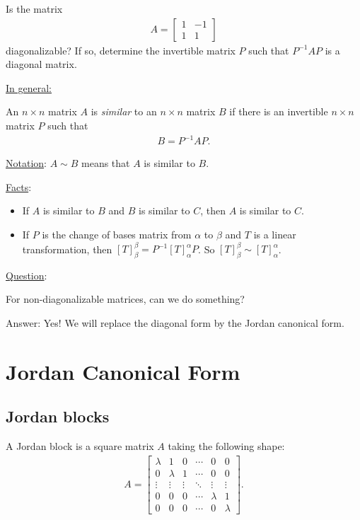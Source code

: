 \documentclass[12pt,a4paper]{article}
\newcounter{example}[section]
\begin{document}
	\newpage
	
	\phantom{2}
	
	\newpage
	
	\begin{example}
	Is the matrix
		\begin{align*}
		A = \begin{bmatrix}
		1 & -1 \\ 1 & 1
		\end{bmatrix}
		\end{align*}
	diagonalizable? If so, determine the invertible matrix $P$ such that $P^{-1} A P$ is a diagonal matrix.
	\end{example}
	
	
	\newpage
	
	\underline{In general:}
	
	An $n \times n$ matrix $A$ is \textit{similar} to an $n \times n$ matrix $B$ if there is an invertible $n \times n$ matrix $P$ such that
		\begin{align*}
		B = P^{-1} A P .
		\end{align*}
		
	\underline{Notation}: $A \sim B$ means that $A$ is similar to $B$.
		
	\underline{Facts}:
		\begin{itemize}
		\item If $A$ is similar to $B$ and $B$ is similar to $C$, then $A$ is similar to $C$.
		\item If $P$ is the change of bases matrix from $\alpha$ to $\beta$ and $T$ is a linear transformation, then $[T]_\beta^\beta = P^{-1} [T]_{\alpha}^\alpha P$. So $[T]_{\beta}^\beta \sim [T]_{\alpha}^\alpha$.
		\end{itemize}
		
	\vspace*{24pt}
	
	\underline{Question}:
	
	For non-diagonalizable matrices, can we do something? 
	
	Answer: Yes! We will replace the diagonal form by the Jordan canonical form.
	
\newpage

\section{Jordan Canonical Form}
	
	\subsection{Jordan blocks}
	A Jordan block is a square matrix $A$ taking the following shape:
		\begin{align*}
		A = \begin{bmatrix}
		\lambda & 1 & 0 & \cdots & 0 & 0\\
		0 & \lambda & 1 & \cdots & 0 & 0\\
		\vdots & \vdots & \vdots & \ddots & \vdots & \vdots \\
		0 & 0 & 0 & \cdots & \lambda & 1 \\
		0 & 0 & 0 & \cdots & 0 & \lambda
		\end{bmatrix} .
		\end{align*}
		
\end{document}
